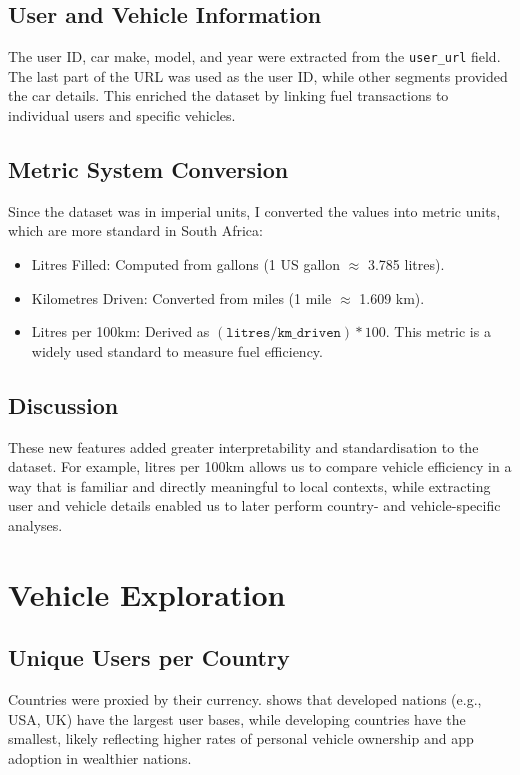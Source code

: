 \documentclass{article}
\begin{document}
\subsection*{User and Vehicle Information}
The user ID, car make, model, and year were extracted from the \texttt{user\_url} field. The last part of the URL was used as the user ID, while other segments provided the car details. This enriched the dataset by linking fuel transactions to individual users and specific vehicles.

\subsection*{Metric System Conversion}
Since the dataset was in imperial units, I converted the values into metric units, which are more standard in South Africa:
\begin{itemize}
    \item Litres Filled: Computed from gallons (1 US gallon $\approx$ 3.785 litres).
    \item Kilometres Driven: Converted from miles (1 mile $\approx$ 1.609 km).
    \item Litres per 100km: Derived as $(\texttt{litres} / \texttt{km\_driven}) * 100$. This metric is a widely used standard to measure fuel efficiency.
\end{itemize}

\subsection*{Discussion}
These new features added greater interpretability and standardisation to the dataset. For example, litres per 100km allows us to compare vehicle efficiency in a way that is familiar and directly meaningful to local contexts, while extracting user and vehicle details enabled us to later perform country- and vehicle-specific analyses.


\section{Vehicle Exploration}

\subsection{Unique Users per Country}
Countries were proxied by their currency.  shows that developed nations (e.g., USA, UK) have the largest user bases, while developing countries have the smallest, likely reflecting higher rates of personal vehicle ownership and app adoption in wealthier nations.
\end{document}
